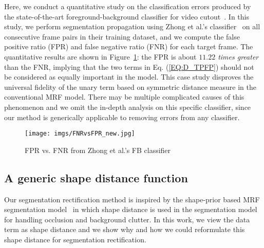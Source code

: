 \documentclass[10pt,journal,compsoc]{newIEEEtran}
\begin{document}
Here, we conduct a quantitative study on the classification errors produced by the state-of-the-art foreground-background classifier for video cutout~\cite{Zhong2012UDC_SIGGRAPHAsia}. In this study, we perform segmentation propagation using Zhong et al.'s classifier~\cite{Zhong2012UDC_SIGGRAPHAsia} on all consecutive frame pairs in their training dataset, and we compute the false positive ratio (FPR) and false negative ratio (FNR) for each target frame. The quantitative results are shown in Figure~\ref{FIG:StatEvid}: the FPR is about {\em $11.22$ times greater} than the FNR, implying that the two terms in Eq. (\ref{EQ:D_TPFP}) should not be considered as equally important in the model. This case study disproves the universal fidelity of the unary term based on symmetric distance measure in the conventional MRF model. There may be multiple complicated causes of this phenomenon and we omit the in-depth analysis on this specific classifier, since our method is generically applicable to removing errors from any classifier.
\begin{figure}
	\centering
	\texttt{[image: imgs/FNRvsFPR\_new.jpg]}
	\caption{FPR vs. FNR from Zhong et al.'s FB classifier \cite{Zhong2012UDC_SIGGRAPHAsia}}\label{FIG:StatEvid}
\end{figure}\subsection{A generic shape distance function}
Our segmentation rectification method is inspired by the shape-prior based MRF segmentation model~\cite{Freedman2005ShapePriorGC,Vu2008Shape} in which shape distance is used in the segmentation model for handling occlusion and background clutter. In this work, we view the data term as shape distance and we show why and how we could reformulate this shape distance for segmentation rectification.
\end{document}
